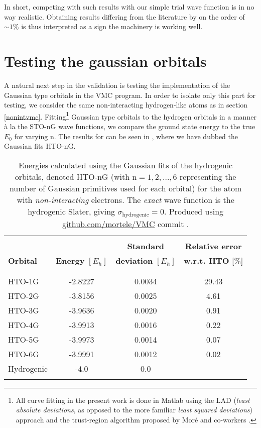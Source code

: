 \documentclass[../../master.tex]{subfiles}
\begin{document}
In short, competing with such results with our simple trial wave function is in no way realistic. Obtaining results differing from the literature by on the order of $\sim 1\%$ is thus interpreted as a sign the machinery is working well. 


\section{Testing the gaussian orbitals}
A natural next step in the validation is testing the implementation of the Gaussian type orbitals in the VMC program. In order to isolate only this part for testing, we consider the same non-interacting hydrogen-like atoms as in section \ref{nonintvmc}. Fitting\footnote{All curve fitting in the present work is done in {\sc Matlab} using the LAD (\emph{least absolute deviations}, as opposed to the more familiar \emph{least squared deviations}) approach and the trust-region algorithm proposed by Moré and co-workers \cite{charnes1955optimal,koenker1978regression,more1983computing}.} Gaussian type orbitals to the hydrogen orbitals in a manner à la the STO-nG wave functions, we compare the ground state energy to the true $E_0$ for varying n. The results for  can be seen in , where we have dubbed the Gaussian fits HTO-nG.

\begin{table}
\centering{}
\setlength\extrarowheight{2pt}
\begin{tabularx}{\textwidth}{X *{3}{S[table-format=-1.3,table-space-text-post=***]}}
\hline
\hline
\\[-0.9em]
                 &                          & \phantom{-}\textbf{Standard}          & \textbf{Relative error}    \\
\textbf{Orbital} & \textbf{Energy} $[E_h]$  & \textbf{deviation} $[E_h]$ & \textbf{w.r.t. HTO} [$\%$]  \\
\\[-0.9em]
\hline
\\[-0.9em]
HTO-1G & -2.8227  & 0.0034  &   29.43 \\
HTO-2G & -3.8156  & 0.0025  &    4.61 \\
HTO-3G & -3.9636  & 0.0020  &    0.91 \\
HTO-4G & -3.9913  & 0.0016  &    0.22 \\
HTO-5G & -3.9973  & 0.0014  &    0.07 \\
HTO-6G & -3.9991  & 0.0012  &    0.02 \\
Hydrogenic    & -4.0    & 0.0 & \\
\\[-0.9em]
\hline
\end{tabularx}
\caption{Energies calculated using the Gaussian fits of the hydrogenic orbitals, denoted HTO-nG (with $\text{n}=1,2,\dots,6$ representing the number of Gaussian primitives used for each orbital) for the  atom with \emph{non-interacting} electrons. The \emph{exact} wave function is the hydrogenic Slater, giving $\sigma_\text{hydrogenic}=0$. Produced using \url{github.com/mortele/VMC} commit . \label{tab:vmcgaussnonint}}
\end{table}
\end{document}
